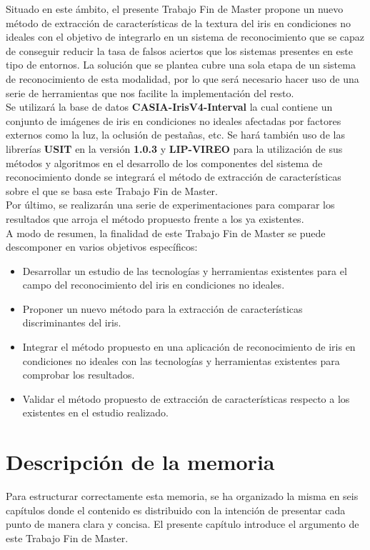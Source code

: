 Situado en este ámbito, el presente Trabajo Fin de Master propone un nuevo método de extracción de características de la textura del iris en condiciones no ideales con el objetivo de integrarlo en un sistema de reconocimiento que se capaz de conseguir reducir la tasa de falsos aciertos que los sistemas presentes en este tipo de entornos. La solución que se plantea cubre una sola etapa de un sistema de reconocimiento de esta modalidad, por lo que será necesario hacer uso de una serie de herramientas que nos facilite la implementación del resto. \\

Se utilizará la base de datos \textbf{CASIA-IrisV4-Interval} la cual contiene un conjunto de imágenes de iris en condiciones no ideales afectadas por factores externos como la luz, la oclusión de pestañas, etc. Se hará también uso de las librerías \textbf{USIT} en la versión \textbf{1.0.3} y \textbf{LIP-VIREO} para la utilización de sus métodos y algoritmos en el desarrollo de los componentes del sistema de reconocimiento donde se integrará el método de extracción de características sobre el que se basa este Trabajo Fin de Master. \\

Por último, se realizarán una serie de experimentaciones para comparar los resultados que arroja el método propuesto frente a los ya existentes. \\

A modo de resumen, la finalidad de este Trabajo Fin de Master se puede descomponer en varios objetivos específicos:
\begin{itemize}
	\item Desarrollar un estudio de las tecnologías y herramientas existentes para el campo del reconocimiento del iris en condiciones no ideales.
	\item Proponer un nuevo método para la extracción de características discriminantes del iris.
	\item Integrar el método propuesto en una aplicación de reconocimiento de iris en condiciones no ideales con las tecnologías y herramientas existentes para comprobar los resultados.
	\item Validar el método propuesto de extracción de características respecto a los existentes en el estudio realizado.
\end{itemize}


\section{Descripción de la memoria}
Para estructurar correctamente esta memoria, se ha organizado la misma en seis capítulos donde el contenido es distribuido con la intención de presentar cada punto de manera clara y concisa. El presente capítulo introduce el argumento de este Trabajo Fin de Master. \\

